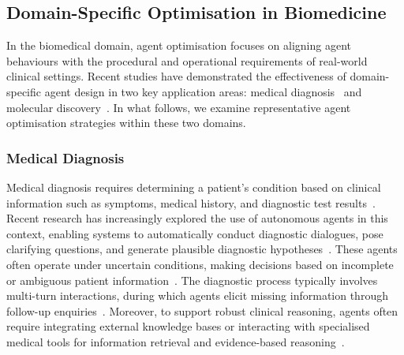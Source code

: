 \documentclass[]{selfevolagent}
\theoremstyle{plain}
\theoremstyle{definition}
\theoremstyle{remark}
\begin{document}
\subsection{Domain-Specific Optimisation in Biomedicine} 
In the biomedical domain, agent optimisation focuses on aligning agent behaviours with the procedural and operational requirements of real-world clinical settings. Recent studies have demonstrated the effectiveness of domain-specific agent design in two key application areas: medical diagnosis~\citep{donner2018solving,almansoori2025self,zhuang2025learning} and molecular discovery~\citep{m2024augmenting,inoue2025drugagent}. In what follows, we examine representative agent optimisation strategies within these two domains. 


\subsubsection{Medical Diagnosis}

Medical diagnosis requires determining a patient’s condition based on clinical information such as symptoms, medical history, and diagnostic test results~\citep{KONONENKO200189,donner2018solving}. Recent research has increasingly explored the use of autonomous agents in this context, enabling systems to automatically conduct diagnostic dialogues, pose clarifying questions, and generate plausible diagnostic hypotheses~\citep{li2024agent,chen2025enhancing,zuo2025kg4diagnosis,ghezloo2025pathfinder}. These agents often operate under uncertain conditions, making decisions based on incomplete or ambiguous patient information~\citep{chen2025enhancing}. The diagnostic process typically involves multi-turn interactions, during which agents elicit missing information through follow-up enquiries~\citep{chen2025enhancing}. Moreover, to support robust clinical reasoning, agents often require integrating external knowledge bases or interacting with specialised medical tools for information retrieval and evidence-based reasoning~\citep{feng2025m,fallahpour2025medrax}.
\end{document}
